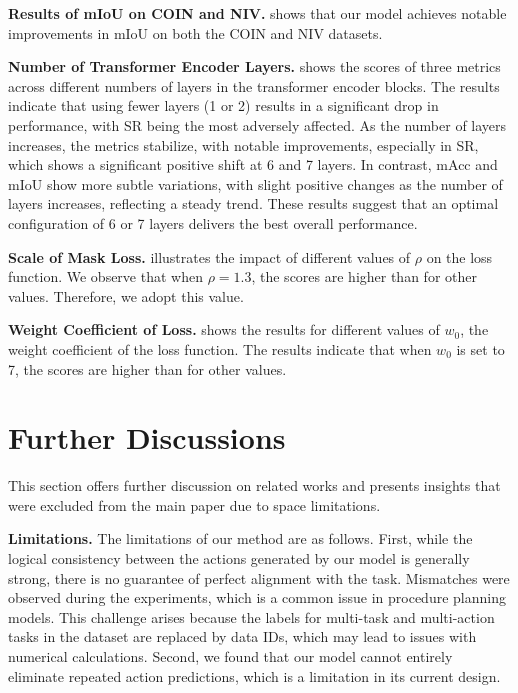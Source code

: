 \textbf{Results of mIoU on COIN and NIV.}  shows that our model achieves notable improvements in mIoU on both the COIN and NIV datasets.

\textbf{Number of Transformer Encoder Layers.}  shows the scores of three metrics across different numbers of layers in the transformer encoder blocks. The results indicate that using fewer layers (1 or 2) results in a significant drop in performance, with SR being the most adversely affected. As the number of layers increases, the metrics stabilize, with notable improvements, especially in SR, which shows a significant positive shift at 6 and 7 layers. In contrast, mAcc and mIoU show more subtle variations, with slight positive changes as the number of layers increases, reflecting a steady trend. These results suggest that an optimal configuration of 6 or 7 layers delivers the best overall performance.

\textbf{Scale of Mask Loss.}  illustrates the impact of different values of $\rho$ on the loss function. We observe that when $\rho=1.3$, the scores are higher than for other values. Therefore, we adopt this value.

\textbf{Weight Coefficient of Loss.}  shows the results for different values of $w_0$, the weight coefficient of the loss function. The results indicate that when $w_0$ is set to 7, the scores are higher than for other values.


\section{Further Discussions}
This section offers further discussion on related works and presents insights that were excluded from the main paper due to space limitations. 

\textbf{Limitations.} The limitations of our method are as follows. First, while the logical consistency between the actions generated by our model is generally strong, there is no guarantee of perfect alignment with the task. Mismatches were observed during the experiments, which is a common issue in procedure planning models. This challenge arises because the labels for multi-task and multi-action tasks in the dataset are replaced by data IDs, which may lead to issues with numerical calculations. 
Second, we found that our model cannot entirely eliminate repeated action predictions, which is a limitation in its current design.

